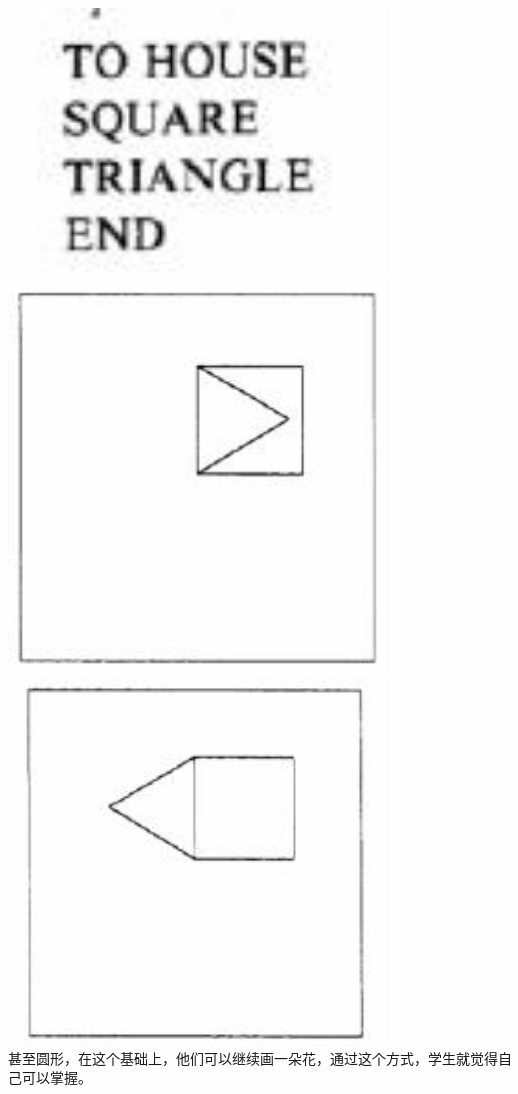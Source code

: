 \includegraphics[width=10cm]{mindstorm_p721.jpg}\\
\includegraphics[width=10cm]{mindstorm_p722.jpg}\\
\includegraphics[width=10cm]{mindstorm_p73.jpg}\\
甚至圆形，在这个基础上，他们可以继续画一朵花，通过这个方式，学生就觉得自己可以掌握。

